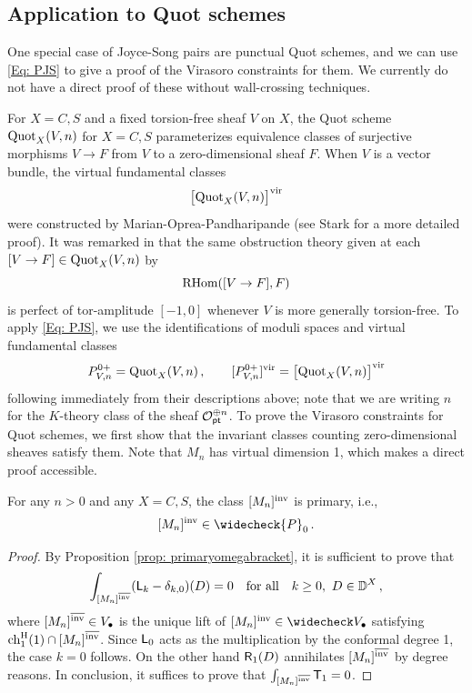 \documentclass[a4paper, 12pt]{amsart}
\begin{document}
\begin{appendices}
\subsection{Application to Quot schemes}

One special case of Joyce-Song pairs are punctual Quot schemes, and we can use \eqref{Eq: PJS} to give a proof of the Virasoro constraints for them. We currently do not have a direct proof of these without wall-crossing techniques. 

For $X=C,S$ and a fixed torsion-free sheaf $V$ on $X$, the Quot scheme $\text{Quot}_X(V,n)$ for $X=C,S$ parameterizes equivalence classes of surjective morphisms $V\to F$ from $V$ to a zero-dimensional sheaf $F$. When $V$ is a vector bundle, the virtual fundamental classes 
$$
\big[\text{Quot}_X(V,n)\big]^{\mathrm{vir}}
$$
were constructed by Marian-Oprea-Pandharipande \cite[Lemma 1.1]{MOP1} (see Stark \cite[Proposition 5]{stark2} for a more detailed proof). It was remarked in \cite[Section 1.1]{Bo21.5} that the same obstruction theory given at each $[V\to F]\in \text{Quot}_X(V,n)$ by
$$
\mathrm{RHom}([V\to F], F)
$$
is perfect of tor-amplitude $[-1,0]$ whenever $V$ is more generally torsion-free. To apply \eqref{Eq: PJS}, we use the identifications of moduli spaces and virtual fundamental classes
$$
P^{0+}_{V,n} = \text{Quot}_X(V,n)\,,\qquad [P^{0+}_{V,n}]^{\mathrm{vir}} = \big[\text{Quot}_X(V,n)\big]^{\mathrm{vir}}
$$
following immediately from their descriptions above; note that we are writing $n$ for the $K$-theory class of the sheaf ${\mathcal O}_{{\mathsf{pt}}}^{\oplus n}$.
To prove the Virasoro constraints for Quot schemes, we first show that the invariant classes counting zero-dimensional sheaves satisfy them. Note that $M_n$ has virtual dimension 1, which makes a direct proof accessible. 

\begin{lemma}
\label{Lem: Mnp}
    For any $n>0$ and any $X=C,S$, the class $[M_{n}]^{\mathrm{inv}}$ is primary, i.e.,
$$
[M_n]^\inva\in \widecheck{P}_0\,.
$$
\end{lemma}
\begin{proof}
By Proposition \ref{prop: primaryomegabracket}, it is sufficient to prove that 
$$
\int_{[M_{n}]^{\overline{\mathrm{inv}}}} ({\mathsf{L}}_k - \delta_{k,0})(D) =0\quad \textnormal{for all}\quad k\geq 0,\ D\in {\mathbb{D}}^X\,,
$$
where $[M_{n}]^{\overline{\mathrm{inv}}}\in V_\bullet$ is the unique lift of $[M_n]^\inva\in \widecheck V_\bullet$ satisfying $\mathrm{ch}^{\mathrm{H}}_1(1)\cap [M_{n}]^{\overline{\mathrm{inv}}}$. Since ${\mathsf{L}}_0$ acts as the multiplication by the conformal degree 1, the case $k=0$ follows. On the other hand $\mathsf{R}_{1}(D)$ annihilates $[M_{n}]^{\overline{\mathrm{inv}}}$ by degree reasons. In conclusion, it suffices to prove that $\int_{[M_{n}]^{\overline{\mathrm{inv}}}} {\mathsf{T}}_{1}=0$. 


\end{proof}
\end{appendices}
\end{document}

